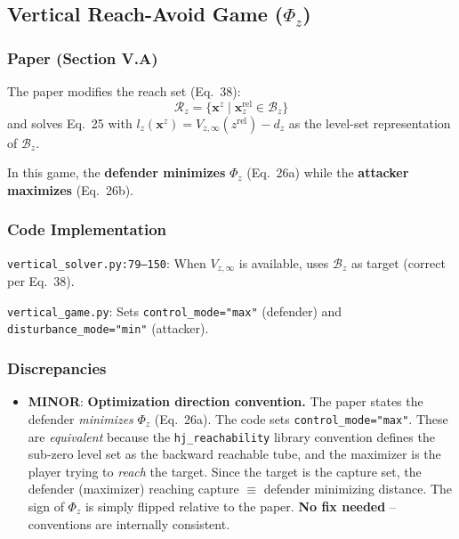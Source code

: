 \documentclass[11pt,a4paper]{article}
\begin{document}
\subsection{Vertical Reach-Avoid Game ($\Phi_z$)}

\subsubsection{Paper (Section V.A)}

The paper modifies the reach set (Eq.~38):
\begin{equation}
\mathcal{R}_z = \{\mathbf{x}^z \mid \mathbf{x}^{\mathrm{rel}}_z \in \mathcal{B}_z\}
\end{equation}
and solves Eq.~25 with $l_z(\mathbf{x}^z) = V_{z,\infty}(z^{\mathrm{rel}}) - d_z$ as the level-set representation of $\mathcal{B}_z$.

In this game, the \textbf{defender minimizes} $\Phi_z$ (Eq.~26a) while the \textbf{attacker maximizes} (Eq.~26b).

\subsubsection{Code Implementation}

\texttt{vertical\_solver.py:79--150}: When $V_{z,\infty}$ is available, uses $\mathcal{B}_z$ as target (correct per Eq.~38).

\texttt{vertical\_game.py}: Sets \texttt{control\_mode="max"} (defender) and \texttt{disturbance\_mode="min"} (attacker).

\subsubsection{Discrepancies}

\begin{itemize}
\item \textcolor{minblue}{\textbf{MINOR}}: \textbf{Optimization direction convention.} The paper states the defender \emph{minimizes} $\Phi_z$ (Eq.~26a). The code sets \texttt{control\_mode="max"}. These are \emph{equivalent} because the \texttt{hj\_reachability} library convention defines the sub-zero level set as the backward reachable tube, and the maximizer is the player trying to \emph{reach} the target. Since the target is the capture set, the defender (maximizer) reaching capture $\equiv$ defender minimizing distance. The sign of $\Phi_z$ is simply flipped relative to the paper. \textbf{No fix needed} -- conventions are internally consistent.
\end{itemize}
\end{document}
